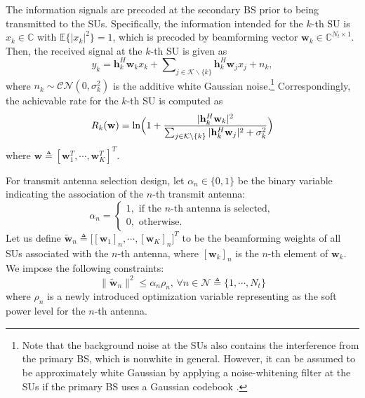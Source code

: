 \documentclass[english]{IEEEtran}
\theoremstyle{plain}
\theoremstyle{remark}
\newcommand{\bw}{\mathbf{w}}
\newcommand{\bh}{\mathbf{h}}
\begin{document}
The information signals are precoded at the secondary BS prior to being transmitted to the SUs. Specifically, the information intended for the $k$-th SU is $x_k\in\mathbb{C}$ with $\mathbb{E}\{|x_k|^2\} = 1$, which is precoded by beamforming vector $\mathbf{w}_k\in\mathbb{C}^{N_t\times 1}$. Then, the received signal at the $k$-th SU is given as
\begin{equation}
y_{k}=\bh^H_{k}\bw_{k}x_{k}+\sum\nolimits_{j\in\mathcal{K}\backslash \{k\}}\bh^{H}_{k}\bw_{j}x_{j}+n_{k},\label{eq:signalmodel}
\end{equation}
where $n_k\sim\mathcal{CN}(0,\sigma_k^2)$ is the additive white Gaussian noise.\footnote{Note that the background noise at the SUs also contains the interference from the primary BS, which is nonwhite in general. However, it can be assumed to be approximately white Gaussian by applying a noise-whitening filter at the SUs if the primary BS  uses a Gaussian codebook \cite{ZhangTSP08}.} Correspondingly, the achievable rate for the $k$-th SU is computed as
\begin{equation}
R_k(\bw) = \ln\Bigl(1+\frac{|\bh^H_{k}\bw_{k}|^2}{\sum_{j\in\mathcal{K}\backslash \{k\}}|\bh^{H}_{k}\bw_{j}|^2 + \sigma_k^2}\Bigr)  \label{eq:Rateformulation}
\end{equation}
where $\bw\triangleq[\bw_1^T,\cdots,\bw_K^T]^T$.

For transmit antenna selection design, let $\alpha_{n}\in\{0,1\}$ be the binary variable indicating the association of the $n$-th transmit antenna:
\begin{equation}
\alpha_n  = \left\{
							\begin{array}{ll}
									1, \mbox{ if  the $n$-th antenna is selected},   \\
									0, \mbox{ otherwise}.
							\end{array}
			   \right.
\label{eq:proba}
\end{equation}
Let us define $\tilde{\bw}_n\triangleq\bigl[[\bw_1]_n,\cdots,[\bw_K]_n\bigr]^T$ to be the beamforming weights of all  SUs associated with the $n$-th antenna, where $[\bw_k]_n$ is the $n$-th element of $\bw_k$. We impose the following constraints: 
\begin{equation}
\|\tilde{\bw}_n\|^2 \leq \alpha_n\rho_n,\,\forall n\in\mathcal{N}\triangleq\{1,\cdots,N_t\}
\end{equation}
where $\rho_n$ is a newly introduced optimization variable representing as the soft power level for the $n$-th antenna. 
\end{document}

